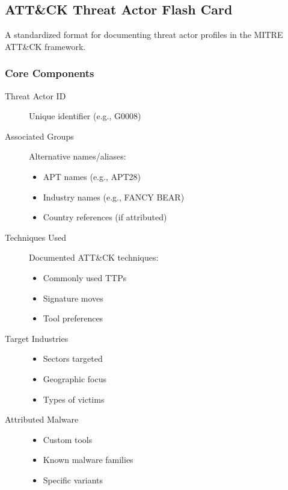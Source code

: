 \subsection{ATT\&CK Threat Actor Flash Card}
A standardized format for documenting threat actor profiles in the MITRE ATT\&CK framework.

\subsubsection{Core Components}
\begin{description}
    \item[Threat Actor ID] Unique identifier (e.g., G0008)
    
    \item[Associated Groups] Alternative names/aliases:
    \begin{itemize}
        \item APT names (e.g., APT28)
        \item Industry names (e.g., FANCY BEAR)
        \item Country references (if attributed)
    \end{itemize}
    
    \item[Techniques Used] Documented ATT\&CK techniques:
    \begin{itemize}
        \item Commonly used TTPs
        \item Signature moves
        \item Tool preferences
    \end{itemize}
    
    \item[Target Industries]
    \begin{itemize}
        \item Sectors targeted
        \item Geographic focus
        \item Types of victims
    \end{itemize}
    
    \item[Attributed Malware]
    \begin{itemize}
        \item Custom tools
        \item Known malware families
        \item Specific variants
    \end{itemize}
\end{description}

